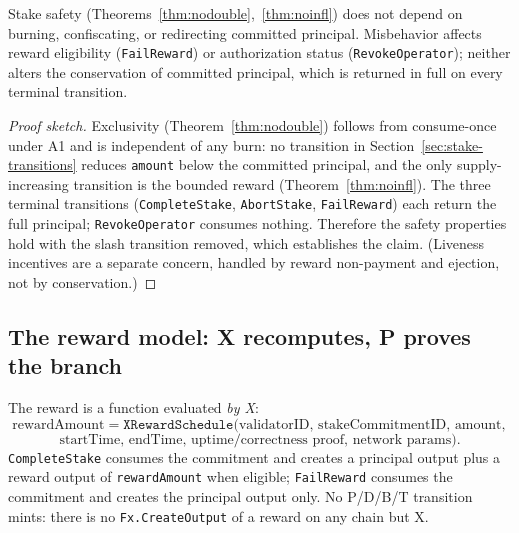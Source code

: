 \begin{theorem}
\label{thm:noslash}
Stake safety (Theorems~\ref{thm:nodouble},~\ref{thm:noinfl}) does not
depend on burning, confiscating, or redirecting committed principal.
Misbehavior affects reward eligibility (\texttt{FailReward}) or
authorization status (\texttt{RevokeOperator}); neither alters the
conservation of committed principal, which is returned in full on every
terminal transition.
\end{theorem}
\begin{proof}[Proof sketch]
Exclusivity (Theorem~\ref{thm:nodouble}) follows from consume-once under
A1 and is independent of any burn: no transition in
Section~\ref{sec:stake-transitions} reduces \texttt{amount} below the
committed principal, and the only supply-increasing transition is the
bounded reward (Theorem~\ref{thm:noinfl}). The three terminal transitions
(\texttt{CompleteStake}, \texttt{AbortStake}, \texttt{FailReward}) each
return the full principal; \texttt{RevokeOperator} consumes nothing.
Therefore the safety properties hold with the slash transition removed,
which establishes the claim. (Liveness incentives are a separate concern,
handled by reward non-payment and ejection, not by conservation.)
\end{proof}

\subsection{The reward model: X recomputes, P proves the branch}
\label{sec:rewardmodel}

The reward is a function evaluated \emph{by X}:
\[
\mathrm{rewardAmount} = \texttt{XRewardSchedule}\bigl(
  \text{validatorID},\,\text{stakeCommitmentID},\,\text{amount},
\]
\[
  \text{startTime},\,\text{endTime},\,\text{uptime/correctness proof},
  \,\text{network params}\bigr).
\]
\texttt{CompleteStake} consumes the commitment and creates a principal
output plus a reward output of \texttt{rewardAmount} when eligible;
\texttt{FailReward} consumes the commitment and creates the principal
output only. No P/D/B/T transition mints: there is no
\texttt{Fx.CreateOutput} of a reward on any chain but X.

